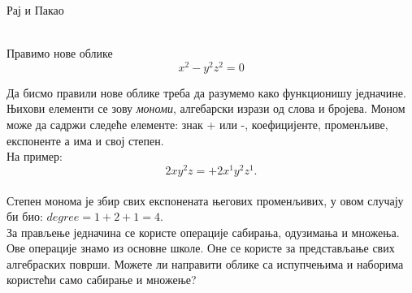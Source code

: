 \documentclass[sr]{./../../common/SurferDesc}%
\begin{document}
\footnotesize


\begin{surferPage}
  \begin{surferTitle}Рај и Пакао\end{surferTitle}  \\
Правимо нове облике \\
\smallskip
\[x^2	- y^2z^2	= 0\]

\singlespacing
Да бисмо правили нове облике треба да разумемо како функционишу једначине. Њихови елементи се зову {\it мономи}, алгебарски изрази од слова и бројева.
\singlespacing
Моном може да садржи следеће елементе:
знак + или -, коефицијенте, променљиве, експоненте а има и свој степен.\\
\singlespacing
На пример: 
\smallskip
\[2xy^2z = +2x^1y^2z^1.\]
\\
\smallskip
Степен монома је збир свих експонената његових променљивих, у овом случају би био: $degree = 1+2+1=4$.  \\
\singlespacing
За прављење једначина се користе операције сабирања, одузимања и множења. Ове операције знамо из основне школе. Оне се користе за представљање свих алгебраских површи.
\singlespacing
Можете ли направити облике са испупчењима и наборима користећи само сабирање и множење?


  \begin{surferText}
     \end{surferText}
\end{surferPage}
\end{document}
